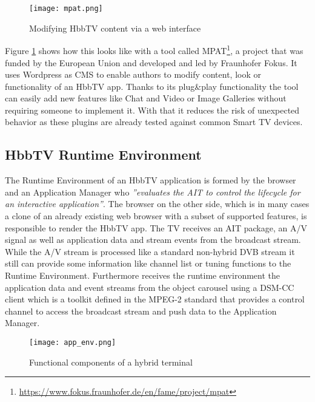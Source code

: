\begin{figure}[htb]
  \centering
  \texttt{[image: mpat.png]}\\
  \caption{
    Modifying HbbTV content via a web interface
  }
  \label{fig:mpat}
\end{figure}

Figure \ref{fig:mpat} shows how this looks like with a tool called MPAT\footnote{\url{https://www.fokus.fraunhofer.de/en/fame/project/mpat}},
a project that was funded by the European Union and developed and led by Fraunhofer Fokus.
It uses Wordpress as CMS to enable authors to modify content, look or functionality of an HbbTV
app. Thanks to its plug\&play functionality the tool can easily add new features like Chat and Video or
Image Galleries without requiring someone to implement it. With that it reduces the risk of unexpected
behavior as these plugins are already tested against common Smart TV devices.

\subsection{HbbTV Runtime Environment\label{sec:hbbtvruntimeenvironment}}

The Runtime Environment of an HbbTV application is formed by the browser and an Application Manager who
\textit{''evaluates the AIT to control the lifecycle for an interactive application''}\cite{hbbtv15}.
The browser on the other side, which is in many cases a clone of an already existing web browser with
a subset of supported features, is responsible to render the HbbTV app. The TV receives an AIT package,
an A/V signal as well as application data and stream events from the broadcast stream. While the A/V
stream is processed like a standard non-hybrid DVB stream it still can provide some information like
channel list or tuning functions to the Runtime Environment. Furthermore receives the runtime environment
the application data and event streams from the object carousel using a DSM-CC client which is a
toolkit defined in the MPEG-2 standard that provides a control channel to access the broadcast stream
and push data to the Application Manager.

\begin{figure}[htb]
  \centering
  \texttt{[image: app\_env.png]}\\
  \caption{
    Functional components of a hybrid terminal
  }
  \label{fig:app_env}
\end{figure}

